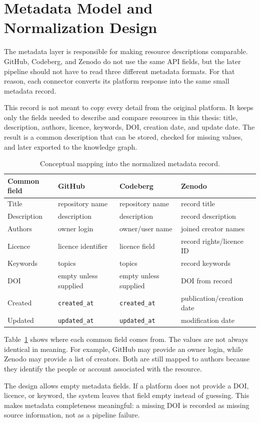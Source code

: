 \section{Metadata Model and Normalization Design}
\label{sec:metadata-model-design}

The metadata layer is responsible for making resource descriptions comparable. GitHub, Codeberg, and Zenodo do not use the same API fields, but the later pipeline should not have to read three different metadata formats. For that reason, each connector converts its platform response into the same small metadata record.

This record is not meant to copy every detail from the original platform. It keeps only the fields needed to describe and compare resources in this thesis: title, description, authors, licence, keywords, DOI, creation date, and update date. The result is a common description that can be stored, checked for missing values, and later exported to the knowledge graph.

\begin{table}[htbp]
\centering
\caption{Conceptual mapping into the normalized metadata record.}
\label{tab:metadata-mapping}
\small
\begin{tabularx}{\textwidth}{@{}p{2.3cm}XXX@{}}
\toprule
Common field & GitHub & Codeberg & Zenodo\tabularnewline
\midrule
Title & repository name & repository name & record title\tabularnewline
Description & description & description & record description\tabularnewline
Authors & owner login & owner/user name & joined creator names\tabularnewline
Licence & licence identifier & licence field & record rights/licence ID\tabularnewline
Keywords & topics & topics & record keywords\tabularnewline
DOI & empty unless supplied & empty unless supplied & DOI from record\tabularnewline
Created & \texttt{created\_at} & \texttt{created\_at} & publication/creation date\tabularnewline
Updated & \texttt{updated\_at} & \texttt{updated\_at} & modification date\tabularnewline
\bottomrule
\end{tabularx}
\end{table}

Table~\ref{tab:metadata-mapping} shows where each common field comes from. The values are not always identical in meaning. For example, GitHub may provide an owner login, while Zenodo may provide a list of creators. Both are still mapped to authors because they identify the people or account associated with the resource.

The design allows empty metadata fields. If a platform does not provide a DOI, licence, or keyword, the system leaves that field empty instead of guessing. This makes metadata completeness meaningful: a missing DOI is recorded as missing source information, not as a pipeline failure.

